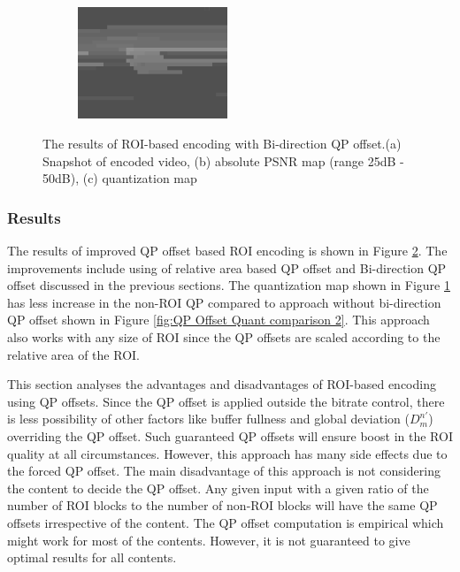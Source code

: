 \documentclass[11pt]{article} %
\begin{document}
\begin{figure}
\begin{subfigure}[t]{\textwidth}
	\centering
	\includegraphics[width=0.49\textwidth]{QPOffset/Bi_direction/Paul250kbps_uni_QP_offset_Bi_4_quant.png}
	\caption{}
	\label{fig:Bi-direction QP offset result quant}
	\end{subfigure}
	\caption{The results of ROI-based encoding with Bi-direction QP offset.(a) Snapshot of encoded video, (b) absolute PSNR map (range 25dB - 50dB), (c) quantization map}
	\label{fig:Bi-direction QP offset result}
\end{figure}

\subsubsection{Results}
The results of improved QP offset based ROI encoding is shown in Figure \ref{fig:Bi-direction QP offset result}. The improvements include using of relative area based QP offset and Bi-direction QP offset discussed in the previous sections. The quantization map shown in Figure \ref{fig:Bi-direction QP offset result quant} has less increase in the non-ROI QP compared to approach without bi-direction QP offset shown in Figure \ref{fig:QP Offset Quant comparison 2}. This approach also works with any size of ROI since the QP offsets are scaled according to the relative area of the ROI.
 
This section analyses the advantages and disadvantages of ROI-based encoding using QP offsets. Since the QP offset is applied outside the bitrate control, there is less possibility of other factors like buffer fullness and global deviation ($D_m^{n'}$) overriding the QP offset. Such guaranteed QP offsets will ensure boost in the ROI quality at all circumstances. However, this approach has many side effects due to the forced QP offset. The main disadvantage of this approach is not considering the content to decide the QP offset. Any given input with a given ratio of the number of ROI blocks to the number of non-ROI blocks will have the same QP offsets irrespective of the content. The QP offset computation is empirical which might work for most of the contents. However, it is not guaranteed to give optimal results for all contents.
\end{document}
